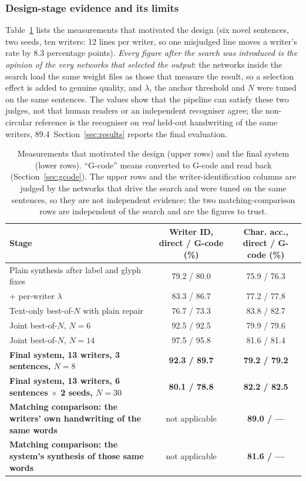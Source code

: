 \subsubsection{Design-stage evidence and its limits}

Table~\ref{tab:syn-evid} lists the measurements that motivated the design (six novel sentences, two seeds, ten writers: 12 lines per writer, so one misjudged line moves a writer's rate by 8.3 percentage points).
\emph{Every figure after the search was introduced is the opinion of the very networks that selected the output}: the networks inside the search load the same weight files as those that measure the result, so a selection effect is added to genuine quality, and $\lambda$, the anchor threshold and $N$ were tuned on the same sentences.
The values show that the pipeline can satisfy these two judges, not that human readers or an independent recogniser agree; the non-circular reference is the recogniser on \emph{real} held-out handwriting of the same writers, 89.4\,%
Section~\ref{sec:results} reports the final evaluation.

\begin{table}[!htbp]
\centering
\fontsize{9.5}{11.5}\selectfont
\begin{tabularx}{\linewidth}{|X|c|c|}
\hline
\textbf{Stage} & \textbf{Writer ID, direct / G-code (\%)} & \textbf{Char. acc., direct / G-code (\%)} \\
\hline
Plain synthesis after label and glyph fixes & 79.2 / 80.0 & 75.9 / 76.3 \\
\hline
+ per-writer $\lambda$ & 83.3 / 86.7 & 77.2 / 77.8 \\
\hline
Text-only best-of-$N$ with plain repair & 76.7 / 73.3 & 83.8 / 82.7 \\
\hline
Joint best-of-$N$, $N=6$ & 92.5 / 92.5 & 79.9 / 79.6 \\
\hline
Joint best-of-$N$, $N=14$ & 97.5 / 95.8 & 81.6 / 81.4 \\
\hline
\textbf{Final system, 13 writers, 3 sentences, $N=8$} & \textbf{92.3 / 89.7} & \textbf{79.2 / 79.2} \\
\hline
\textbf{Final system, 13 writers, 6 sentences $\times$ 2 seeds, $N=30$} & \textbf{80.1 / 78.8} & \textbf{82.2 / 82.5} \\
\hline
\textbf{Matching comparison: the writers' own handwriting of the same words} & not applicable & \textbf{89.0 / ---} \\
\hline
\textbf{Matching comparison: the system's synthesis of those same words} & not applicable & \textbf{81.6 / ---} \\
\hline
\end{tabularx}
\caption{Measurements that motivated the design (upper rows) and the final system (lower rows). ``G-code'' means converted to G-code and read back (Section~\ref{sec:gcode}). The upper rows and the writer-identification columns are judged by the networks that drive the search and were tuned on the same sentences, so they are not independent evidence; the two matching-comparison rows are independent of the search and are the figures to trust.}
\label{tab:syn-evid}
\end{table}

